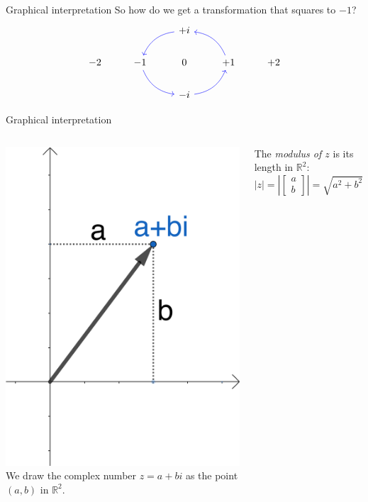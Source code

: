 \documentclass{beamer}
\begin{document}
\begin{frame}[fragile]{Graphical interpretation}
So how do we get a transformation that squares to $-1$?
\begin{equation*}
\begin{tikzcd}
{} & {} & +i \arrow[bend right, color = blue]{dl} & {} & {}\\
-2 & -1\arrow[bend right, color = blue]{dr} & 0 & +1 \arrow[bend right, color = blue]{ul} & +2\\
{} & {} & -i\arrow[bend right, color = blue]{ur} & {} & {}
\end{tikzcd}
\end{equation*}
\end{frame}

\begin{frame}[fragile]{Graphical interpretation}
\begin{columns}
	\includegraphics[scale=0.8]{complex-plane.png}
	We draw the complex number $z=a+bi$ as the point $(a, b)$ in $\mathbb{R}^2$.\vfill
	\begin{definition}
	The \emph{modulus of $z$} is its length in $\mathbb{R}^2$:
	\begin{equation*}
	|z| = \left| \left[
	\begin{array}{c}
	a\\
	b
	\end{array}
	\right]\right| = \sqrt{a^2+b^2}
	\end{equation*}
	\end{definition}
\end{columns}
\end{frame}
\end{document}
